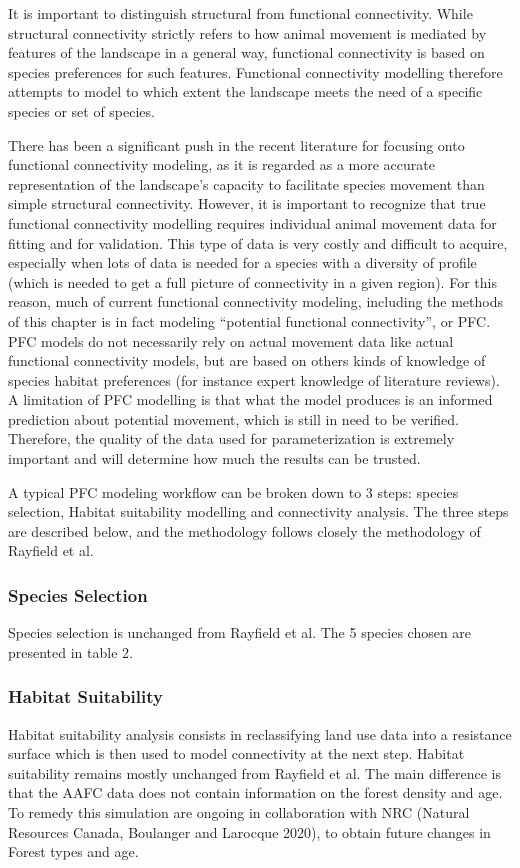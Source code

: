 It is important to distinguish structural from functional connectivity. While structural connectivity strictly refers to how animal movement is mediated by features of the landscape in a general way, functional connectivity is based on species preferences for such features. Functional connectivity modelling therefore attempts to model to which extent the landscape meets the need of a specific species or set of species.

There has been a significant push in the recent literature for focusing onto functional connectivity modeling, as it is regarded as a more accurate representation of  the landscape’s capacity to facilitate species movement than simple structural connectivity. However, it is important to recognize that true functional connectivity modelling requires individual animal movement data for fitting and for validation. This type of data is very costly and difficult to acquire, especially when lots of data is needed for a species with a diversity of profile (which is needed to get a full picture of connectivity in a given region). For this reason, much of current functional connectivity modeling, including the methods of this chapter is in fact modeling “potential functional connectivity”, or PFC. PFC models do not necessarily rely on actual movement data like actual functional connectivity models, but are based on others kinds of knowledge of species habitat preferences (for instance expert knowledge of literature reviews). A limitation of PFC modelling is that what the model produces is an informed prediction about potential movement, which is still in need to be verified. Therefore, the quality of the data used for parameterization is extremely important and will determine how much the results can be trusted.

A typical PFC modeling workflow can be broken down to 3 steps: species selection, Habitat suitability modelling and connectivity analysis. The three steps are described below, and the methodology follows closely the methodology of Rayfield et al.\\

\subsubsection{Species Selection}
Species selection is unchanged from Rayfield et al. The 5 species chosen are presented in table 2.\\

\subsubsection{Habitat Suitability}
Habitat suitability analysis consists in reclassifying land use data into a resistance surface which is then used to model connectivity at the next step.
Habitat suitability remains mostly unchanged from Rayfield et al. The main difference is that the AAFC data does not contain information on the forest density and age. To remedy this simulation are ongoing in collaboration with NRC (Natural Resources Canada, Boulanger and Larocque 2020), to obtain future changes in Forest types and age.\\

